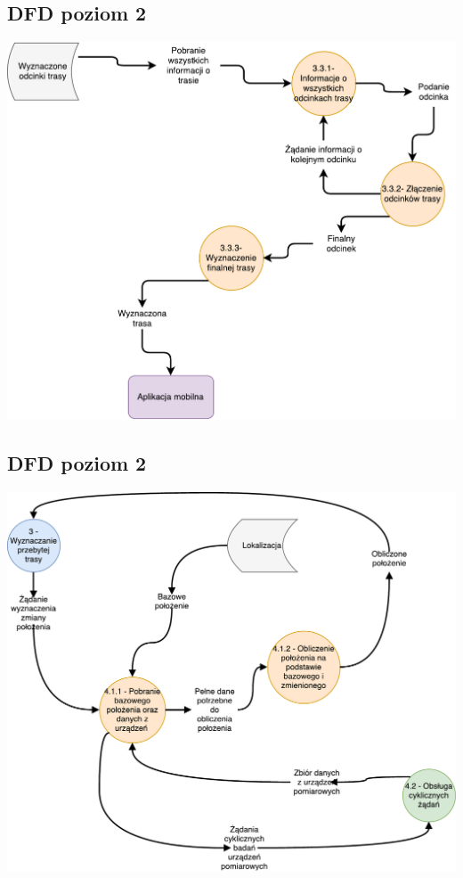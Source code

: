 \documentclass[11pt]{article}
\begin{document}
	\subsection{DFD poziom 2}
	\begin{center}
		\includegraphics[scale=0.6]{DFD33.pdf}
	\end{center}
	\newpage
	\subsection{DFD poziom 2}
	\begin{center}
		\includegraphics[scale=0.6]{DFD41.pdf}
	\end{center}
\end{document}
